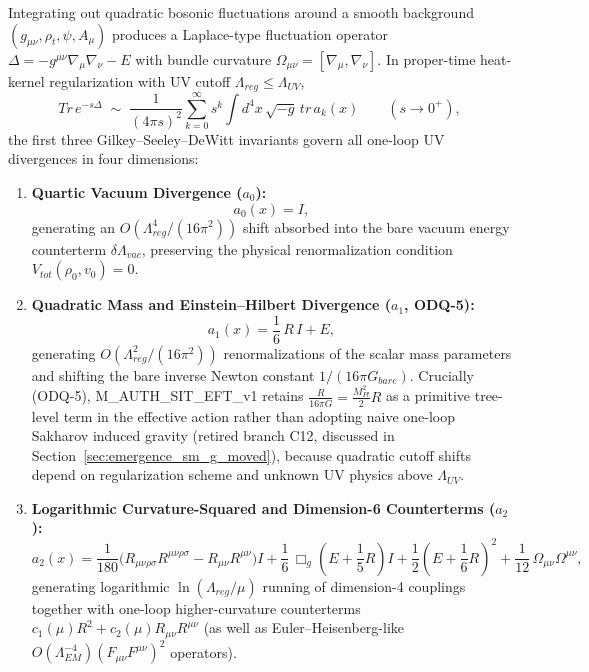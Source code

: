 \documentclass[american,11pt,letterpaper]{article}
\def\mathrm#1{#1}%
\def\texttt#1{#1}%
\def\emph#1{#1}%
\begin{document}
Integrating out quadratic bosonic fluctuations around a smooth background $(g_{\mu\nu}, \rho_t, \psi, A_\mu)$ produces a Laplace-type fluctuation operator $\Delta = -g^{\mu\nu}\nabla_\mu\nabla_\nu - E$ with bundle curvature $\Omega_{\mu\nu} = [\nabla_\mu, \nabla_\nu]$. In proper-time heat-kernel regularization with UV cutoff $\Lambda_{\mathrm{reg}} \le \Lambda_{\mathrm{UV}}$,
\begin{equation}
\mathrm{Tr}\,e^{-s\Delta}
\;\sim\;
\frac{1}{(4\pi s)^2}\sum_{k=0}^\infty s^k \int d^4x\,\sqrt{-g}\,\mathrm{tr}\,a_k(x)
\qquad (s \to 0^+),
\label{eq:heat_kernel_asymptotic}
\end{equation}
the first three Gilkey--Seeley--DeWitt invariants govern all one-loop UV divergences in four dimensions:
\begin{enumerate}[leftmargin=2em]
  \item \textbf{Quartic Vacuum Divergence ($a_0$):}
  \begin{equation}
  a_0(x) = I,
  \end{equation}
  generating an $O(\Lambda_{\mathrm{reg}}^4 / (16\pi^2))$ shift absorbed into the bare vacuum energy counterterm $\delta\Lambda_{\mathrm{vac}}$, preserving the physical renormalization condition $V_{\mathrm{tot}}(\rho_0, v_0) = 0$.
  \item \textbf{Quadratic Mass and Einstein--Hilbert Divergence ($a_1$, \texttt{ODQ-5}):}
  \begin{equation}
  a_1(x) = \frac{1}{6}\,R\,I + E,
  \end{equation}
  generating $O(\Lambda_{\mathrm{reg}}^2/(16\pi^2))$ renormalizations of the scalar mass parameters and shifting the bare inverse Newton constant $1/(16\pi G_{\mathrm{bare}})$. Crucially (\texttt{ODQ-5}), \texttt{M\_AUTH\_SIT\_EFT\_v1} retains $\frac{R}{16\pi G} = \frac{M_{\mathrm{Pl}}^2}{2}R$ as a \emph{primitive} tree-level term in the effective action rather than adopting naive one-loop Sakharov induced gravity (retired branch \texttt{C12}, discussed in Section~\ref{sec:emergence_sm_g_moved}), because quadratic cutoff shifts depend on regularization scheme and unknown UV physics above $\Lambda_{\mathrm{UV}}$.
  \item \textbf{Logarithmic Curvature-Squared and Dimension-6 Counterterms ($a_2$):}
  \begin{equation}
  a_2(x)
  = \frac{1}{180}\bigl(R_{\mu\nu\rho\sigma}R^{\mu\nu\rho\sigma} - R_{\mu\nu}R^{\mu\nu}\bigr)I
    + \frac{1}{6}\,\Box_g\!\left(E + \frac{1}{5}R\right)I
    + \frac{1}{2}\left(E + \frac{1}{6}R\right)^2
    + \frac{1}{12}\,\Omega_{\mu\nu}\Omega^{\mu\nu},
  \label{eq:seeley_dewitt_a2}
  \end{equation}
  generating logarithmic $\ln(\Lambda_{\mathrm{reg}}/\mu)$ running of dimension-4 couplings together with one-loop higher-curvature counterterms $c_1(\mu)R^2 + c_2(\mu)R_{\mu\nu}R^{\mu\nu}$ (as well as Euler--Heisenberg-like $O(\Lambda_{\mathrm{EM}}^{-4})(F_{\mu\nu}F^{\mu\nu})^2$ operators).
\end{enumerate}
\end{document}
